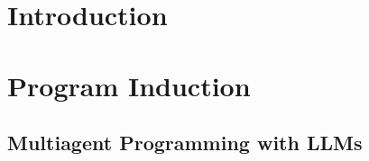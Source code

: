 \usepackage{lipsum}




\coverpage{\TITLE}{\SUBTITLE}{\AUTHOR}{\DATE}{\SUBJECT}

\newpage



\tableofcontents

\listoffigures

\listoftables


\printnomenclature

\part{Introduction}
\label{part:intro}

\newpage


\newpage


\newpage


\part{Program Induction}
\label{part:proginduction}

\newpage


\newpage


\newpage


\newpage


\newpage


\newpage
\chapter{Multiagent Programming with LLMs}
\label{ch:seidr}
%

